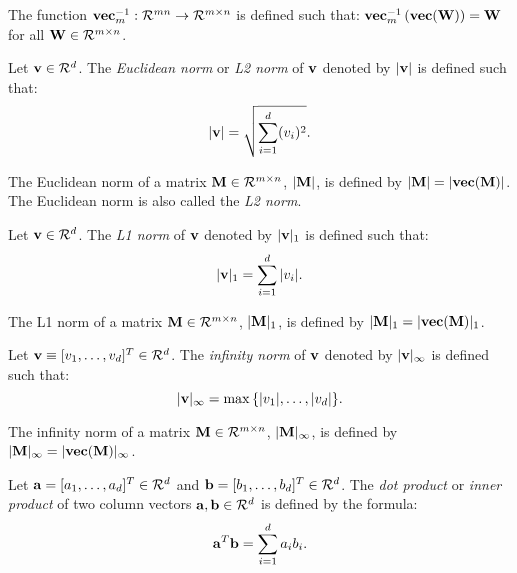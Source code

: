 \begin{definition}
The function ${\bf vec}^{-1} _m: {\cal R}^{mn} \rightarrow {\cal R}^{m \times n}$
is defined such that:
${\bf vec}^{-1}_m \left( {\bf vec}({\bf W})\right) = {\bf W}$
for all ${\bf W} \in {\cal R}^{m \times n}$.
\end{definition}

\begin{definition}
Let ${\bf v} \in {\cal R}^d$.
The {\em Euclidean norm} or {\em L2 norm} of ${\bf v}$ denoted by $|{\bf v}|$
is defined such that: 
\begin{displaymath}
|{\bf v}| = \sqrt{ \sum_{i=1}^d (v_i)^2 }.
\end{displaymath}
\end{definition}

The Euclidean norm of a matrix ${\bf M} \in {\cal R}^{m \times n}$,
$|{\bf M}|$, is defined by $|{\bf M}| = |{\bf vec}({\bf M})|$.
The Euclidean norm is also called the {\em L2 norm}.

\begin{definition}[L1 Norm]
Let ${\bf v} \in {\cal R}^d$.
The {\em L1 norm} of ${\bf v}$ denoted by $|{\bf v}|_1$
is defined such that: 
\begin{displaymath}
|{\bf v}|_1 = \sum_{i=1}^d |v_i|.
\end{displaymath}
\end{definition}

The L1 norm of a matrix ${\bf M} \in {\cal R}^{m \times n}$,
$|{\bf M}|_1$, is defined by $|{\bf M}|_1 = |{\bf vec}({\bf M})|_1$.

\begin{definition}
Let ${\bf v} \equiv [v_1, \ldots, v_d]^T \in {\cal R}^d$.
The {\em infinity norm} of ${\bf v}$ denoted by $|{\bf v}|_{\infty}$
is defined such that: 
\begin{displaymath}
|{\bf v}|_{\infty} = \max{ \{ |v_1|, \ldots, |v_d| \} }.
\end{displaymath}
\end{definition}

The infinity norm of a matrix ${\bf M} \in {\cal R}^{m \times n}$,
$|{\bf M}|_{\infty}$, is defined by $|{\bf M}|_{\infty} = |{\bf vec}({\bf M})|_{\infty}$.


\begin{definition}
Let ${\bf a} = [a_1, \ldots, a_d]^T \in {\cal R}^d$ and 
${\bf b} = [b_1, \ldots, b_d]^T \in {\cal R}^d$.
The {\em dot product} or {\em inner product} of two column vectors
${\bf a}, {\bf b} \in {\cal R}^d$ is defined by the formula:
\begin{displaymath}
{\bf a}^T {\bf b} = \sum_{i=1}^d a_i b_i.
\end{displaymath}
\end{definition}

